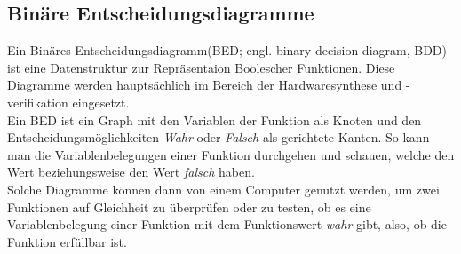 \subsection{Binäre Entscheidungsdiagramme}
Ein Binäres Entscheidungsdiagramm(BED; engl. binary decision diagram, BDD) ist eine Datenstruktur zur Repräsentaion Boolescher Funktionen. Diese Diagramme werden hauptsächlich im Bereich der Hardwaresynthese und -verifikation eingesetzt.\\
Ein BED ist ein Graph mit den Variablen der Funktion als Knoten und den Entscheidungsmöglichkeiten \emph{Wahr} oder \emph{Falsch} als gerichtete Kanten. So kann man die Variablenbelegungen einer Funktion durchgehen und schauen, welche den Wert  beziehungsweise den Wert \emph{falsch} haben.\\
Solche Diagramme können dann von einem Computer genutzt werden, um zwei Funktionen auf Gleichheit zu überprüfen oder zu testen, ob es eine Variablenbelegung einer Funktion mit dem Funktionswert \emph{wahr} gibt, also, ob die Funktion erfüllbar ist.

